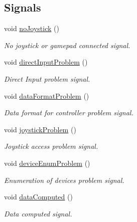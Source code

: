 \subsection*{Signals}
\begin{DoxyCompactItemize}
\item 
void \hyperlink{class_joystick_grabber_ad950726c1b3772c6c1f6f84b46ccd4b7}{no\-Joystick} ()
\begin{DoxyCompactList}\small\item\em No joystick or gamepad connected signal. \end{DoxyCompactList}\item 
void \hyperlink{class_joystick_grabber_a3b76bcfe0b0dbb84108b0e07939ae17a}{direct\-Input\-Problem} ()
\begin{DoxyCompactList}\small\item\em Direct Input problem signal. \end{DoxyCompactList}\item 
void \hyperlink{class_joystick_grabber_abd28f72631e9ed164cda0a20d2dfa6c6}{data\-Format\-Problem} ()
\begin{DoxyCompactList}\small\item\em Data format for controller problem signal. \end{DoxyCompactList}\item 
void \hyperlink{class_joystick_grabber_a81149a5fdf6fee31bf5ebb410e36ec79}{joystick\-Problem} ()
\begin{DoxyCompactList}\small\item\em Joystick access problem signal. \end{DoxyCompactList}\item 
void \hyperlink{class_joystick_grabber_aba1214b33a7489e7af702bc3644e5d32}{device\-Enum\-Problem} ()
\begin{DoxyCompactList}\small\item\em Enumeration of devices problem signal. \end{DoxyCompactList}\item 
void \hyperlink{class_joystick_grabber_a09db4dae51da75becab8485e5359a2a7}{data\-Computed} ()
\begin{DoxyCompactList}\small\item\em Data computed signal. \end{DoxyCompactList}\end{DoxyCompactItemize}
